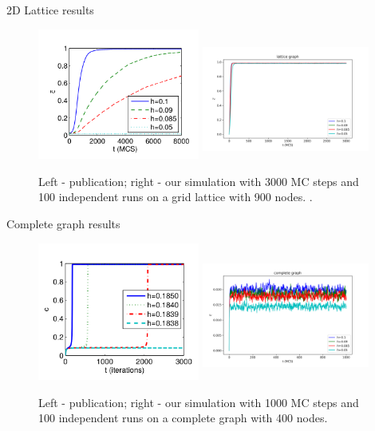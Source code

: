 \documentclass[10pt]{beamer}
\begin{document}
\begin{frame}{2D Lattice results}
	\begin{figure}
		\includegraphics[width=0.475\textwidth]{../resources/images/fig7-left.png}
		\hfill
		\includegraphics[width=5.5cm, height=4cm]{../results/images/lattice_900.png}
		\caption{Left - publication; right - our simulation with 3000 MC steps and 100 independent runs on a grid lattice with 900 nodes. .}
	\end{figure}
\end{frame}

\begin{frame}{Complete graph results}
	\begin{figure}
		\includegraphics[width=0.475\textwidth]{../resources/images/fig10-left.png}
		\hfill
		\includegraphics[width=5.5cm, height=4.3cm]{../results/images/complete.png}
		\caption{Left - publication; right - our simulation with 1000 MC steps and 100 independent runs on a complete graph with 400 nodes.  }
	\end{figure}
\end{frame}
\end{document}
